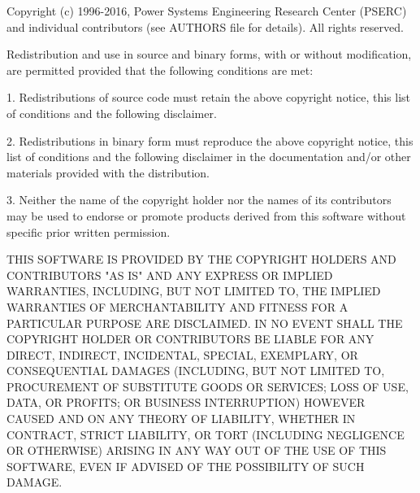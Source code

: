 \begin{Notice}
	Copyright (c) 1996-2016, Power Systems Engineering Research Center
	(PSERC) and individual contributors (see AUTHORS file for details).
	All rights reserved.
	
	Redistribution and use in source and binary forms, with or without
	modification, are permitted provided that the following conditions
	are met:
	
	1. Redistributions of source code must retain the above copyright
	notice, this list of conditions and the following disclaimer.
	
	2. Redistributions in binary form must reproduce the above copyright
	notice, this list of conditions and the following disclaimer in the
	documentation and/or other materials provided with the distribution.
	
	3. Neither the name of the copyright holder nor the names of its
	contributors may be used to endorse or promote products derived from
	this software without specific prior written permission.
	
	THIS SOFTWARE IS PROVIDED BY THE COPYRIGHT HOLDERS AND CONTRIBUTORS
	"AS IS" AND ANY EXPRESS OR IMPLIED WARRANTIES, INCLUDING, BUT NOT
	LIMITED TO, THE IMPLIED WARRANTIES OF MERCHANTABILITY AND FITNESS
	FOR A PARTICULAR PURPOSE ARE DISCLAIMED. IN NO EVENT SHALL THE
	COPYRIGHT HOLDER OR CONTRIBUTORS BE LIABLE FOR ANY DIRECT, INDIRECT,
	INCIDENTAL, SPECIAL, EXEMPLARY, OR CONSEQUENTIAL DAMAGES (INCLUDING,
	BUT NOT LIMITED TO, PROCUREMENT OF SUBSTITUTE GOODS OR SERVICES;
	LOSS OF USE, DATA, OR PROFITS; OR BUSINESS INTERRUPTION) HOWEVER
	CAUSED AND ON ANY THEORY OF LIABILITY, WHETHER IN CONTRACT, STRICT
	LIABILITY, OR TORT (INCLUDING NEGLIGENCE OR OTHERWISE) ARISING IN
	ANY WAY OUT OF THE USE OF THIS SOFTWARE, EVEN IF ADVISED OF THE
	POSSIBILITY OF SUCH DAMAGE.
\end{Notice}